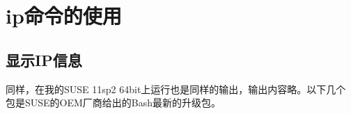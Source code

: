 \section{ip命令的使用}
\label{sec:ipCmd}

\subsection{显示IP信息}

同样，在我的SUSE 11sp2 64bit上运行也是同样的输出，输出内容略。以下几个
包是SUSE的OEM厂商给出的Bash最新的升级包。

